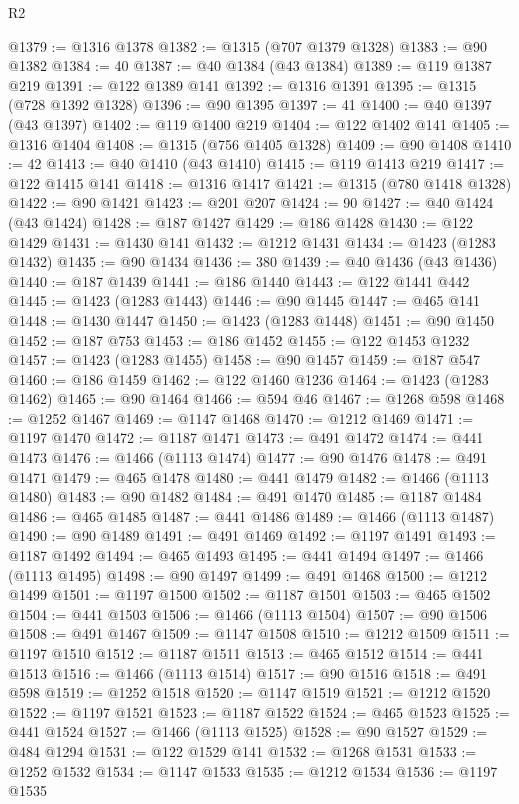 \begin{lexlean}{R2}
\begin{coremodule}
{{{{{{{{{{{{{{{{{{{{{{{{{{{{{{{{{{{{{{{{{{{{{{{{{{{{{{{{{{{{{{{{{{{{{{{{{{{{{{{{{{{{{{{{{{{{@1379 := @1316 @1378
@1382 := @1315 (@707 @1379 @1328)
@1383 := @90 @1382
@1384 := 40
@1387 := @40 @1384 (@43 @1384)
@1389 := @119 @1387 @219
@1391 := @122 @1389 @141
@1392 := @1316 @1391
@1395 := @1315 (@728 @1392 @1328)
@1396 := @90 @1395
@1397 := 41
@1400 := @40 @1397 (@43 @1397)
@1402 := @119 @1400 @219
@1404 := @122 @1402 @141
@1405 := @1316 @1404
@1408 := @1315 (@756 @1405 @1328)
@1409 := @90 @1408
@1410 := 42
@1413 := @40 @1410 (@43 @1410)
@1415 := @119 @1413 @219
@1417 := @122 @1415 @141
@1418 := @1316 @1417
@1421 := @1315 (@780 @1418 @1328)
@1422 := @90 @1421
@1423 := @201 @207
@1424 := 90
@1427 := @40 @1424 (@43 @1424)
@1428 := @187 @1427
@1429 := @186 @1428
@1430 := @122 @1429
@1431 := @1430 @141
@1432 := @1212 @1431
@1434 := @1423 (@1283 @1432)
@1435 := @90 @1434
@1436 := 380
@1439 := @40 @1436 (@43 @1436)
@1440 := @187 @1439
@1441 := @186 @1440
@1443 := @122 @1441 @442
@1445 := @1423 (@1283 @1443)
@1446 := @90 @1445
@1447 := @465 @141
@1448 := @1430 @1447
@1450 := @1423 (@1283 @1448)
@1451 := @90 @1450
@1452 := @187 @753
@1453 := @186 @1452
@1455 := @122 @1453 @1232
@1457 := @1423 (@1283 @1455)
@1458 := @90 @1457
@1459 := @187 @547
@1460 := @186 @1459
@1462 := @122 @1460 @1236
@1464 := @1423 (@1283 @1462)
@1465 := @90 @1464
@1466 := @594 @46
@1467 := @1268 @598
@1468 := @1252 @1467
@1469 := @1147 @1468
@1470 := @1212 @1469
@1471 := @1197 @1470
@1472 := @1187 @1471
@1473 := @491 @1472
@1474 := @441 @1473
@1476 := @1466 (@1113 @1474)
@1477 := @90 @1476
@1478 := @491 @1471
@1479 := @465 @1478
@1480 := @441 @1479
@1482 := @1466 (@1113 @1480)
@1483 := @90 @1482
@1484 := @491 @1470
@1485 := @1187 @1484
@1486 := @465 @1485
@1487 := @441 @1486
@1489 := @1466 (@1113 @1487)
@1490 := @90 @1489
@1491 := @491 @1469
@1492 := @1197 @1491
@1493 := @1187 @1492
@1494 := @465 @1493
@1495 := @441 @1494
@1497 := @1466 (@1113 @1495)
@1498 := @90 @1497
@1499 := @491 @1468
@1500 := @1212 @1499
@1501 := @1197 @1500
@1502 := @1187 @1501
@1503 := @465 @1502
@1504 := @441 @1503
@1506 := @1466 (@1113 @1504)
@1507 := @90 @1506
@1508 := @491 @1467
@1509 := @1147 @1508
@1510 := @1212 @1509
@1511 := @1197 @1510
@1512 := @1187 @1511
@1513 := @465 @1512
@1514 := @441 @1513
@1516 := @1466 (@1113 @1514)
@1517 := @90 @1516
@1518 := @491 @598
@1519 := @1252 @1518
@1520 := @1147 @1519
@1521 := @1212 @1520
@1522 := @1197 @1521
@1523 := @1187 @1522
@1524 := @465 @1523
@1525 := @441 @1524
@1527 := @1466 (@1113 @1525)
@1528 := @90 @1527
@1529 := @484 @1294
@1531 := @122 @1529 @141
@1532 := @1268 @1531
@1533 := @1252 @1532
@1534 := @1147 @1533
@1535 := @1212 @1534
@1536 := @1197 @1535
}}}}}}}}}}}}}}}}}}}}}}}}}}}}}}}}}}}}}}}}}}}}}}}}}}}}}}}}}}}}}}}}}}}}}}}}}}}}}}}}}}}}}}}}}}}}
\end{coremodule}
\end{lexlean}
